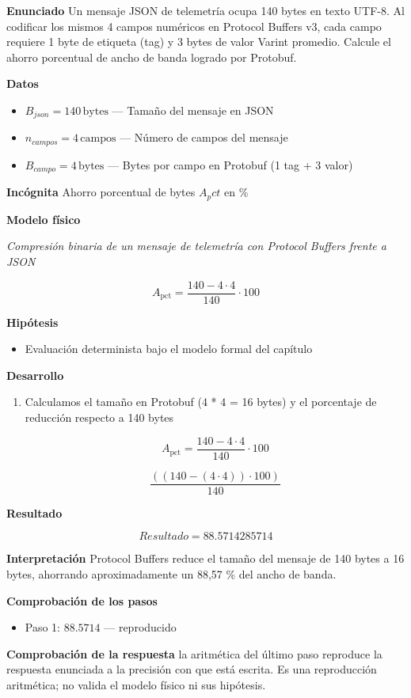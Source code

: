 \documentclass{book}
\begin{document}
\begin{tcolorbox}[title={Problema resuelto}, studiumworked, breakable]

\noindent\textbf{Enunciado}
Un mensaje JSON de telemetría ocupa 140 bytes en texto UTF-8. Al codificar los mismos 4 campos numéricos en Protocol Buffers v3, cada campo requiere 1 byte de etiqueta (tag) y 3 bytes de valor Varint promedio. Calcule el ahorro porcentual de ancho de banda logrado por Protobuf.

\noindent\textbf{Datos}
\begin{itemize}
\item $B_{json} = 140\,\mathrm{bytes}$ — Tamaño del mensaje en JSON
\item $n_{campos} = 4\,\mathrm{campos}$ — Número de campos del mensaje
\item $B_{campo} = 4\,\mathrm{bytes}$ — Bytes por campo en Protobuf (1 tag + 3 valor)
\end{itemize}

\noindent\textbf{Incógnita}
Ahorro porcentual de bytes \(A_pct\) en \%

\noindent\textbf{Modelo físico}

\noindent\textit{Compresión binaria de un mensaje de telemetría con Protocol Buffers frente a JSON}

\[
A_{\text{pct}} = \frac{140 - 4 \cdot 4}{140} \cdot 100
\]

\noindent\textbf{Hipótesis}
\begin{itemize}
\item Evaluación determinista bajo el modelo formal del capítulo
\end{itemize}

\noindent\textbf{Desarrollo}
\begin{enumerate}
\item
Calculamos el tamaño en Protobuf (4 * 4 = 16 bytes) y el porcentaje de reducción respecto a 140 bytes

\[
A_{\text{pct}} = \frac{140 - 4 \cdot 4}{140} \cdot 100
\]

\[
\frac{\left(\left(140-\left(4\cdot 4\right)\right)\cdot 100\right)}{140}
\]
\end{enumerate}

\noindent\textbf{Resultado}

\[
Resultado = 88.5714285714
\]

\noindent\textbf{Interpretación}
Protocol Buffers reduce el tamaño del mensaje de 140 bytes a 16 bytes, ahorrando aproximadamente un 88,57 \% del ancho de banda.

\noindent\textbf{Comprobación de los pasos}
\begin{itemize}
\item Paso 1: $88.5714$ — reproducido
\end{itemize}

\noindent\textbf{Comprobación de la respuesta} la aritmética del último paso reproduce la respuesta enunciada a la precisión con que está escrita. Es una reproducción aritmética; no valida el modelo físico ni sus hipótesis.
\end{tcolorbox}
\end{document}
